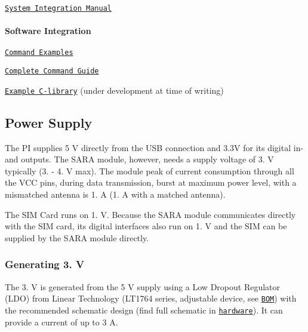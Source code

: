 \begin{DoxyItemize}
\item \href{https://www.u-blox.com/en/docs/UBX-13000995}{\tt System Integration Manual} \paragraph*{Software Integration}
\end{DoxyItemize}


\begin{DoxyItemize}
\item \href{https://www.u-blox.com/sites/default/files/AT-CommandsExamples_AppNote_%28UBX-13001820%29.pdf}{\tt Command Examples}
\item \href{https://www.u-blox.com/en/docs/UBX-13002752}{\tt Complete Command Guide}
\item \href{https://github.com/u-blox/cellular}{\tt Example C-\/library} (under development at time of writing)
\end{DoxyItemize}

\subsection*{Power Supply}

The PI supplies 5 V directly from the U\+SB connection and 3.\+3V for its digital in-\/ and outputs. The S\+A\+RA module, however, needs a supply voltage of 3. V typically (3. -\/ 4. V max). The module peak of current consumption through all the V\+CC pins, during data transmission, burst at maximum power level, with a mismatched antenna is 1. A (1. A with a matched antenna).

The S\+IM Card runs on 1. V. Because the S\+A\+RA module communicates directly with the S\+IM card, its digital interfaces also run on 1. V and the S\+IM can be supplied by the S\+A\+RA module directly.

\subsubsection*{Generating 3. V}

The 3. V is generated from the 5 V supply using a Low Dropout Regulator (L\+DO) from Linear Technology (L\+T1764 series, adjustable device, see \href{https://github.com/itsBelinda/ENG5220-2020-Team13/blob/master/hardware/PCBProduction/BEESAFE.BOM}{\tt {\ttfamily B\+OM}}) with the recommended schematic design (find full schematic in \href{https://github.com/itsBelinda/ENG5220-2020-Team13/tree/master/hardware}{\tt {\ttfamily hardware}}). It can provide a current of up to 3 A.

